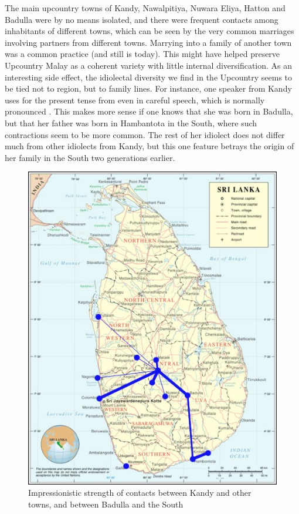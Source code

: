 The main upcountry towns of Kandy, Nawalpitiya, Nuwara Eliya, Hatton and Badulla were by no means isolated, and there were frequent contacts among inhabitants of different towns, which can be seen by the very common marriages involving partners from different towns. Marrying into a family of another town was a common practice (and still is today). This might have  helped preserve Upcountry Malay as a coherent variety with little internal diversification. As an interesting side effect, the idiolectal diversity we find in the Upcountry seems to be tied not to region, but to family lines. For instance, one speaker from Kandy uses  for the present tense from  even in careful speech, which is normally pronounced . This makes more sense if one knows that she was born in Badulla, but that her father was born in Hambantota in the South, where such contractions seem to be more common. The rest of her idiolect does not differ much from other idiolects from Kandy, but this one feature betrays the origin of her family in the South two generations earlier.


\begin{figure}
 \centering
 \includegraphics[height=0.3\textheight]{pics/Kandy-network}
 \caption[Strength of contacts between Kandy and other towns]{Impressionistic strength of contacts between Kandy and other towns, and between Badulla and the South}
 \label{fig:Kandynetwork}
\end{figure}

